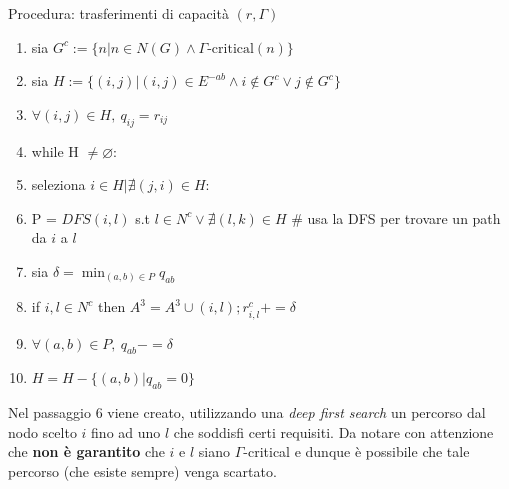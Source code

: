 \documentclass[a4paper, 11pt]{report}
\newcommand{\gmm}{$\Gamma$}
\begin{document}
\begin{algo}[label = algotrans]{Procedura: trasferimenti di capacità $(r, \Gamma)$}{}
    \begin{enumerate}
        \item sia $G^c := \{n | n\in N(G)\land \Gamma\text{-critical}(n)\}$
        \item sia $H := \{(i,j)| (i,j)\in E^{-ab}\land i \not \in G^c \lor j \not \in G^c\}$
        \item $\forall (i,j)\in H,\ q_{ij} = r_{ij}$
        \item while H $\not = \varnothing$:
        \item seleziona $i \in H | \nexists (j,i) \in H$:
        \item P = $DFS(i, l)$ s.t $l\in N^c \lor \nexists (l,k)\in H$ \# usa la DFS per trovare un path da $i$ a $l$ 
        \item sia $\delta = \min_{(a,b)\in P}q_{ab}$
        \item if $i,l \in N^c$ then $A^3 = A^3 \cup {(i,l)}; r^c_{i,l} += \delta$
        \item $\forall (a,b) \in P,\ q_{ab} -= \delta$
        \item $H = H- \{(a,b) | q_{ab} = 0\}$ 
    \end{enumerate}
\end{algo}
Nel passaggio 6 viene creato, utilizzando una \textit{deep first search} un percorso dal nodo scelto $i$ fino ad uno $l$ che soddisfi certi requisiti.
Da notare con attenzione che \textbf{non è garantito} che $i$ e $l$ siano \gmm-critical e dunque è possibile che tale percorso (che esiste sempre) venga scartato.
\end{document}
